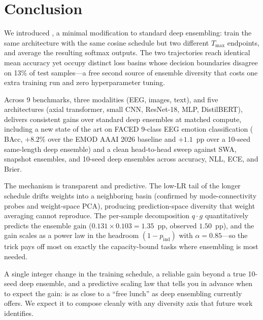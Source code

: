 \section{Conclusion}
\label{sec:conclusion}

We introduced \ours{}, a minimal modification to standard deep
ensembling: train the same architecture with the same cosine schedule
but two different $T_\mathrm{max}$ endpoints, and average the resulting
softmax outputs. The two trajectories reach identical mean accuracy
yet occupy distinct loss basins whose decision boundaries disagree on
13\% of test samples---a free second source of ensemble diversity that
costs one extra training run and zero hyperparameter tuning.

Across 9 benchmarks, three modalities (EEG, images, text), and five
architectures (axial transformer, small CNN, ResNet-18, MLP,
DistilBERT), \ours{} delivers consistent gains over standard deep
ensembles at matched compute, including a new state of the art on
FACED 9-class EEG emotion classification (\facedacc{} BAcc, $+8.2\%$
over the EMOD AAAI 2026 baseline and $+1.1$~pp over a 10-seed
same-length deep ensemble) and a clean head-to-head sweep against SWA,
snapshot ensembles, and 10-seed deep ensembles across accuracy, NLL,
ECE, and Brier.

The mechanism is transparent and predictive. The low-LR tail of the
longer schedule drifts weights into a neighboring basin (confirmed by
mode-connectivity probes and weight-space PCA), producing
prediction-space diversity that weight averaging cannot reproduce. The
per-sample decomposition $q \cdot g$ quantitatively predicts the
ensemble gain ($0.131 \times 0.103 = 1.35$~pp, observed $1.50$~pp),
and the gain scales as a power law in the headroom $(1-p_{\mathrm{ind}})$
with $\alpha = 0.85$---so the trick pays off most on exactly the
capacity-bound tasks where ensembling is most needed.

A single integer change in the training schedule, a reliable gain
beyond a true 10-seed deep ensemble, and a predictive scaling law that
tells you in advance when to expect the gain: \ours{} is as close to a
``free lunch'' as deep ensembling currently offers. We expect it to
compose cleanly with any diversity axis that future work identifies.
